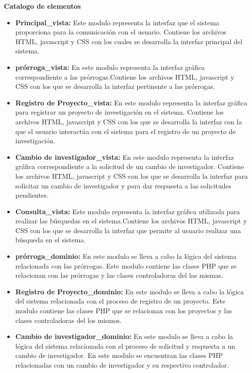 \documentclass[12pt,oneside,letterpaper]{report}
\begin{document}
\textbf{Catalogo de elementos}\\

\begin{itemize}
 \item \textbf{Principal\_vista:} Este modulo representa la interfaz que el sistema proporciona para la comunicación con el usuario. Contiene los archivos HTML,  javascript y CSS con los cuales se desarrolla la interfaz principal del sistema.
 \item \textbf{prórroga\_vista:} En este modulo representa la interfaz gráfica correspondiente a las prórrogas.Contiene los archivos HTML, javascript y CSS con los que se desarrolla la interfaz pertinente a las prórrogas.
 \item \textbf{Registro de Proyecto\_vista:} En este modulo representa la interfaz gráfica para registrar un proyecto de investigación en el sistema. Contiene los archivos HTML, javascript y CSS con los que se desarrolla la interfaz con la que el usuario interactúa con el sistema para el registro de un proyecto de investigación.
 \item \textbf{Cambio de investigador\_vista:} En este modulo representa la interfaz gráfica correspondiente a la solicitud de un cambio de investigador. Contiene los archivos HTML, javascript y CSS con los que se desarrolla la interfaz para solicitar un cambio de investigador y para dar respuesta a las solicitudes pendientes.
 \item \textbf{Consulta\_vista:} Este modulo  representa la interfaz gráfica utilizada para realizar las búsquedas en el sistema.Contiene los archivos HTML, javascript y CSS con los que se desarrolla la interfaz que permite al usuario realizar una búsqueda en el sistema.
 \item \textbf{prórroga\_dominio:} En este modulo se lleva a cabo la lógica del sistema relacionada con las prórrogas. Este modulo contiene las clases PHP que se relacionan con las prórrogas y las clases controladoras del las mismas.
 \item \textbf{Registro de Proyecto\_dominio:} En este modulo se lleva a cabo la lógica del sistema relacionada con el proceso de registro de un proyecto. Este modulo contiene las clases PHP que se relacionan con los proyectos y las clases controladoras del los mismos.
 \item \textbf{Cambio de investigador\_dominio:} En este modulo se lleva a cabo la lógica del sistema relacionada con el proceso de solicitud y respuesta a un cambio de investigador. En este modulo se encuentran las clases PHP relacionadas con un cambio de investigador y su respectivo controlador.

\end{itemize}
\end{document}
